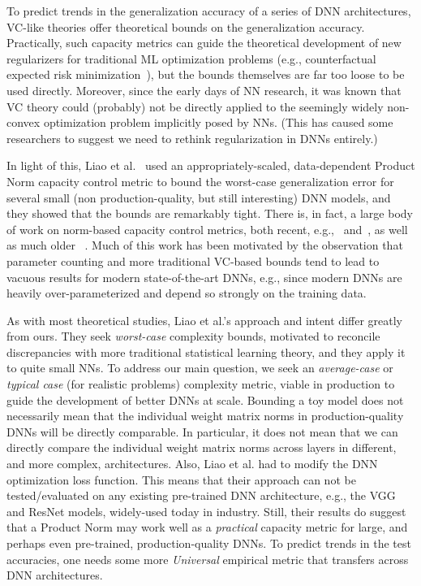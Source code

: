 To predict trends in the generalization accuracy of a series of DNN architectures, VC-like theories offer theoretical bounds on the generalization accuracy. 
Practically, such capacity metrics can guide the
theoretical development of new regularizers for traditional ML optimization problems (e.g., counterfactual expected risk minimization~\cite{JMLR:v16:swaminathan15a}), but the bounds themselves are far too loose to be used directly. 
Moreover, since the early days of NN research, 
it was known that 
VC theory could (probably) not be directly applied to the seemingly widely non-convex optimization problem implicitly posed by NNs. 
(This has caused some researchers to suggest we need to rethink regularization in DNNs entirely.)

In light of this, 
Liao et al.~\cite{LMBx18_TR} used an appropriately-scaled, data-dependent Product Norm capacity control metric to bound the worst-case generalization error for several small (non production-quality, but still interesting) DNN models, and they showed that the bounds are remarkably tight.
%
There is, in fact, a large body of work on norm-based capacity control metrics, both recent, e.g.,~\cite{LMBx18_TR, SHNx17_TR,PLMx18_TR} and~\cite{NTS14_TR,NTS15,NBMS17_TR,BFT17_TR,YM17_TR,KKB17_TR,NBS17_TR,AGNZ18_TR,ACH18_TR,ZF18_TR}, as well as much older ~\cite{Bar97,MN09_TR}. 
Much of this work has been motivated by the observation that parameter counting and more traditional VC-based bounds tend to lead to 
vacuous results for modern state-of-the-art DNNs, e.g., since modern DNNs are heavily over-parameterized and depend so strongly on the training data.

As with most theoretical studies, Liao et al.'s approach and intent differ greatly from ours.
They seek \emph{worst-case} complexity bounds, motivated to reconcile discrepancies with more traditional statistical learning theory, and they apply it to quite small NNs.
To address our main question, we seek an \emph{average-case} or \emph{typical case} (for realistic problems) complexity metric, viable in production to guide the development of better DNNs at scale.
Bounding a toy model does not necessarily mean that the individual weight matrix norms in production-quality DNNs will be directly comparable.
In particular, it does not mean that we can directly compare the individual weight matrix norms across layers in different, and more complex, architectures. 
Also, 
Liao et al. had to modify the DNN optimization loss function.
This means that their approach can not be tested/evaluated on any existing pre-trained DNN architecture, e.g., the VGG and ResNet models, widely-used today in industry. 
Still, their results do suggest that a Product Norm may work well as a \emph{practical} capacity metric for large, and perhaps even pre-trained, production-quality DNNs.   
To predict trends in the test accuracies, one needs some more \emph{Universal} empirical metric that transfers across DNN architectures.

